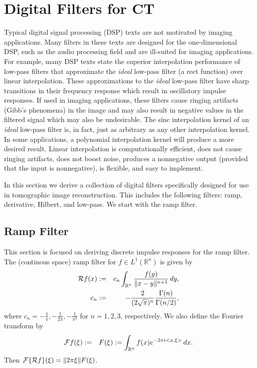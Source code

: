 \section{Digital Filters for CT}

Typical digital signal processing (DSP) texts are not motivated by imaging applications.  Many filters in these texts are designed for the one-dimensional DSP, such as the audio processing field and are ill-suited for imaging applications.  For example, many DSP texts state the superior interpolation performance of low-pass filters that approximate the \textit{ideal} low-pass filter (a rect function) over linear interpolation.  These approximations to the \textit{ideal} low-pass filter have sharp transitions in their frequency response which result in oscillatory impulse responses.  If used in imaging applications, these filters cause ringing artifacts (Gibb's phenomena) in the image and may also result in negative values in the filtered signal which may also be undesirable.  The sinc interpolation kernel of an \textit{ideal} low-pass filter is, in fact, just as arbitrary as any other interpolation kernel.  In some applications, a polynomial interpolation kernel will produce a more desired result.  Linear interpolation is computationally efficient, does not cause ringing artifacts, does not boost noise, produces a nonnegative output (provided that the input is nonnegative), is flexible, and easy to implement.

In this section we derive a collection of digital filters specifically designed for use in tomographic image reconstruction.  This includes the following filters: ramp, derivative, Hilbert, and low-pass.  We start with the ramp filter.

\subsection{Ramp Filter} \label{sec:rampFilter}

This section is focused on deriving discrete impulse responses for the ramp filter.  The (continous space) ramp filter for $f \in L^1(\mathbb{R}^n)$ is given by
\begin{eqnarray}
\mathcal{R} f(x) &:=& c_n \int_{\mathbb{R}^n} \frac{f(y)}{\| x-y\|^{n+1}} \, dy, \\
c_n &:=& -\frac{2}{(2\sqrt{\pi})^n} \frac{\Gamma(n)}{\Gamma(n/2)},
\end{eqnarray}
where $c_n = -\frac{1}{\pi}, -\frac{1}{2\pi}, -\frac{1}{\pi^2}$ for $n = 1, 2, 3$, respectively.  We also define the Fourier transform by
\begin{eqnarray}
\mathcal{F} f(\xi) &:=& F(\xi) := \int_{\mathbb{R}^n} f(x) e^{-2\pi i <x,\xi>} \, dx.
\end{eqnarray}
Then $\mathcal{F} \{\mathcal{R} f\}(\xi) = \|2\pi \xi\| F(\xi)$.

